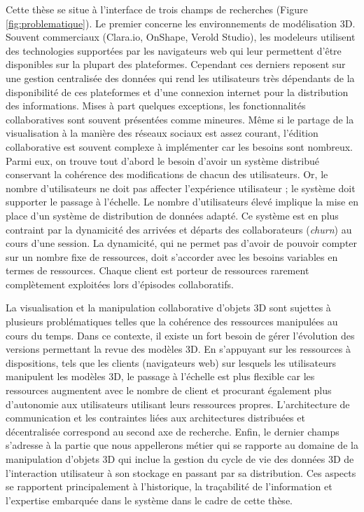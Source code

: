Cette thèse se situe à l'interface de trois champs de recherches (Figure 
\ref{fig:problematique}). Le premier concerne les environnements de modélisation 
3D. Souvent commerciaux (Clara.io, OnShape, Verold Studio), les modeleurs 
utilisent des technologies supportées par les navigateurs web qui leur permettent 
d'être disponibles sur la plupart des plateformes. 
Cependant ces derniers reposent sur une gestion centralisée des données qui rend 
les utilisateurs très dépendants de la disponibilité de ces plateformes et d'une 
connexion internet pour la distribution des informations. 
Mises à part quelques exceptions, les fonctionnalités collaboratives 
sont souvent présentées comme mineures. Même si le \og partage\fg{} de la 
visualisation à la manière des \og réseaux sociaux\fg{} est assez courant, l'édition 
collaborative est souvent complexe à implémenter car les besoins sont nombreux. 
Parmi eux, on trouve tout d'abord le besoin d'avoir un système distribué 
conservant la cohérence des modifications de chacun des utilisateurs. Or, 
le nombre d'utilisateurs ne doit pas affecter l'expérience utilisateur ; le système 
doit supporter le passage à l'échelle. 
Le nombre d'utilisateurs élevé implique la mise en place d'un système de 
distribution de données adapté. Ce système est en plus contraint par la dynamicité
des arrivées et départs des collaborateurs (\textit{churn}) au cours d'une session. 
La dynamicité, qui ne permet pas d'avoir de pouvoir compter sur un nombre fixe de 
ressources, doit s'accorder avec les besoins variables en termes de ressources. 
Chaque client est porteur de ressources rarement complètement exploitées lors 
d'épisodes collaboratifs.

La visualisation et la manipulation collaborative d'objets \gls{3D} sont sujettes à 
plusieurs problématiques telles que la cohérence des ressources manipulées au 
cours du temps. Dans ce contexte, il existe un fort besoin de gérer l'évolution des 
versions permettant la revue des modèles \gls{3D}. 
En s'appuyant sur les ressources à dispositions, tels que les clients (navigateurs 
web) sur lesquels les utilisateurs manipulent les modèles \gls{3D}, le passage à 
l'échelle est plus flexible car les ressources augmentent avec le nombre de client 
et procurant également plus d'autonomie aux utilisateurs utilisant leurs ressources 
propres.
L'architecture de communication et les contraintes liées aux architectures 
distribuées et décentralisée correspond au second axe de recherche. 
Enfin, le dernier champs 
s'adresse à la partie que nous appellerons \og métier\fg{} qui se rapporte au 
domaine de la manipulation d'objets 3D qui inclue la 
gestion du cycle de vie des données 3D de l'interaction utilisateur à son stockage 
en passant par sa distribution. Ces aspects se rapportent principalement à 
l'historique, la traçabilité de l'information et l'expertise embarquée dans le système 
dans le cadre de cette thèse.

